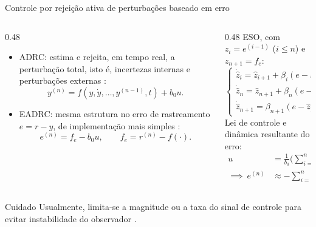 \begin{frame}{Controle por rejeição ativa de perturbações baseado em erro}
  \begin{columns}[T]
    \begin{column}{0.48\textwidth}
      \begin{itemize}[<+->]
        \item ADRC: estima e rejeita, em tempo real, a \alert{perturbação total}, isto é, incertezas internas e perturbações externas \cite{Guo:2016}:
          \begin{equation*}
            y^{(n)} = f(y, \dot{y}, \dots, y^{(n-1)}, t) + b_0 u.
          \end{equation*}
        \item EADRC: mesma estrutura no erro de rastreamento $e = r - y$, de implementação mais simples \cite{Madonski:2019}:
          \begin{equation*}
            e^{(n)} = f_e - b_0 u,
            \qquad
            f_e = r^{(n)} - f(\cdot).
          \end{equation*}
      \end{itemize}
    \end{column}
    \begin{column}{0.48\textwidth}
      \pause
      ESO, com $z_i = e^{(i-1)}$ ($i \leq n$) e $z_{n+1} = f_e$:
      \begin{equation*}
        \begin{cases}
          \dot{\hat{z}}_i = \hat{z}_{i+1} + \beta_i (e - \hat{z}_1), \quad i < n \\
          \dot{\hat{z}}_n = \hat{z}_{n+1} + \beta_n (e - \hat{z}_1) - b_0 u \\
          \dot{\hat{z}}_{n+1} = \beta_{n+1} (e - \hat{z}_1)
        \end{cases}
      \end{equation*}
      Lei de controle e dinâmica resultante do erro:
      \begin{align*}
        u &= \tfrac{1}{b_0}\big(\textstyle\sum_{i=1}^{n} \kappa_i \hat{z}_i + \hat{z}_{n+1}\big) \\
        \implies\ e^{(n)} &\approx -\textstyle\sum_{i=1}^{n} \kappa_i e^{(i-1)}
      \end{align*}
    \end{column}
  \end{columns}
  \vspace{-.5cm}
  \pause
  \begin{alertblock}{Cuidado}
    \small
    Usualmente, limita-se a magnitude ou a taxa do sinal de controle 
    para evitar instabilidade do observador \cite{Herbst:2025}.
  \end{alertblock}
\end{frame}
